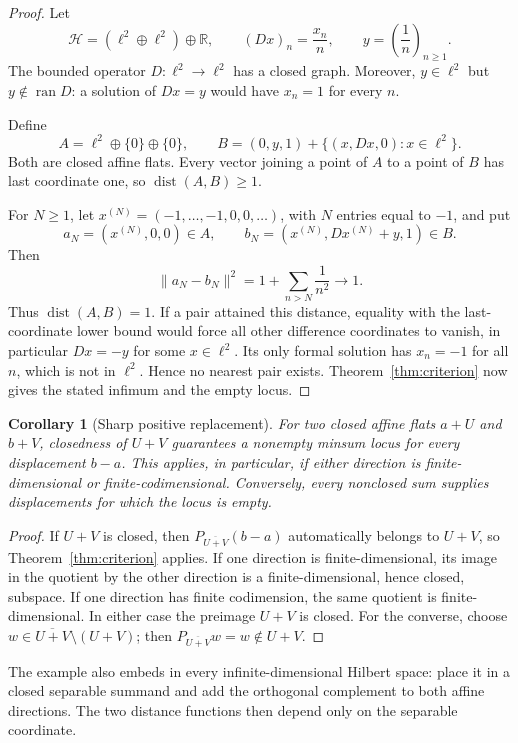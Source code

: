 \documentclass[11pt]{article}
\newtheorem{corollary}[theorem]{Corollary}
\newcommand{\Hsp}{\mathcal H}
\newcommand{\dist}{\operatorname{dist}}
\newcommand{\ran}{\operatorname{ran}}
\begin{document}
\begin{proof}
Let
\[
 \Hsp=(\ell^2\oplus\ell^2)\oplus\mathbb R,
 \qquad (Dx)_n=\frac{x_n}{n},
 \qquad y=\left(\frac1n\right)_{n\ge1}.
\]
The bounded operator $D:\ell^2\to\ell^2$ has a closed graph.  Moreover,
$y\in\ell^2$ but $y\notin\ran D$: a solution of $Dx=y$ would have
$x_n=1$ for every $n$.

Define
\[
 A=\ell^2\oplus\{0\}\oplus\{0\},
 \qquad
 B=(0,y,1)+\{(x,Dx,0):x\in\ell^2\}.
\]
Both are closed affine flats.  Every vector joining a point of $A$ to a point
of $B$ has last coordinate one, so $\dist(A,B)\ge1$.

For $N\ge1$, let $x^{(N)}=(-1,\ldots,-1,0,0,\ldots)$, with $N$ entries
equal to $-1$, and put
\[
 a_N=(x^{(N)},0,0)\in A,
 \qquad
 b_N=(x^{(N)},Dx^{(N)}+y,1)\in B.
\]
Then
\[
 \|a_N-b_N\|^2=1+\sum_{n>N}\frac1{n^2}\longrightarrow1.
\]
Thus $\dist(A,B)=1$.  If a pair attained this distance, equality with the
last-coordinate lower bound would force all other difference coordinates to
vanish, in particular $Dx=-y$ for some $x\in\ell^2$.  Its only formal
solution has $x_n=-1$ for all $n$, which is not in $\ell^2$.  Hence no
nearest pair exists.  Theorem~\ref{thm:criterion} now gives the stated
infimum and the empty locus.
\end{proof}

\begin{corollary}[Sharp positive replacement]
For two closed affine flats $a+U$ and $b+V$, closedness of $U+V$ guarantees a
nonempty minsum locus for every displacement $b-a$.  This applies, in
particular, if either direction is finite-dimensional or finite-codimensional.
Conversely, every nonclosed sum supplies displacements for which the locus is
empty.
\end{corollary}

\begin{proof}
If $U+V$ is closed, then $P_{\overline{U+V}}(b-a)$ automatically belongs to
$U+V$, so Theorem~\ref{thm:criterion} applies.  If one direction is
finite-dimensional, its image in the quotient by the other direction is a
finite-dimensional, hence closed, subspace.  If one direction has finite
codimension, the same quotient is finite-dimensional.  In either case the
preimage $U+V$ is closed.  For the converse, choose
$w\in\overline{U+V}\setminus(U+V)$; then $P_{\overline{U+V}}w=w\notin U+V$.
\end{proof}

The example also embeds in every infinite-dimensional Hilbert space: place it
in a closed separable summand and add the orthogonal complement to both affine
directions.  The two distance functions then depend only on the separable
coordinate.
\end{document}
